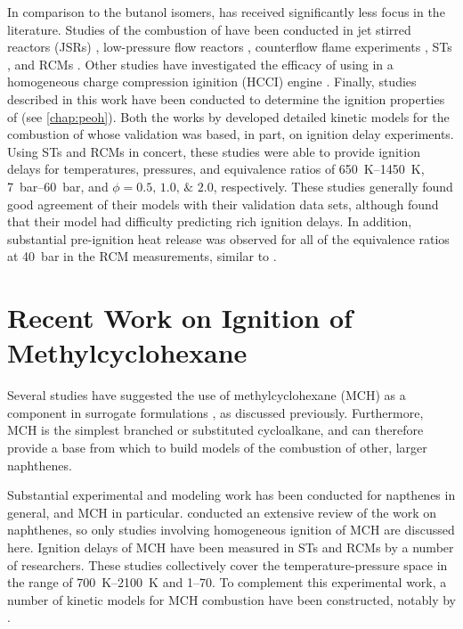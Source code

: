 \documentclass[../main.tex]{subfiles}
\begin{document}
In comparison to the butanol isomers, \iPeOH{} has received significantly
less focus in the literature. Studies of the combustion of \iPeOH{}
have been conducted in jet stirred reactors (JSRs) \cite{Dayma2011,Togbe2011,Sarathy2013}, low-pressure flow
reactors \cite{Welz2012}, counterflow flame experiments \cite{Sarathy2013},
STs \cite{Sarathy2013, Tsujimura2012, Tang2013}, and RCMs
\cite{Sarathy2013, Tsujimura2012}. Other studies have investigated
the efficacy of using \iPeOH{} in a homogeneous charge compression iginition (HCCI) engine \cite{Tsujimura2011,
Yacoub1998, Yang2010}. Finally, studies described in this work have
been conducted to determine the ignition properties of \iPeOH{} (see \cref{chap:peoh}).
Both the works by \textcite{Tsujimura2012, Sarathy2013} developed
detailed kinetic models for the combustion of \iPeOH{} whose validation
was based, in part, on ignition delay experiments. Using STs and
RCMs in concert, these studies were able to provide ignition delays
for temperatures, pressures, and equivalence ratios of
\SIrange{650}{1450}{\kelvin}, \SIrange{7}{60}{\bar}, and $\phi =
\numlist{0.5;1.0;2.0}$, respectively. These studies generally found good
agreement of their models with their validation data sets, although
\textcite{Sarathy2013} found that their model had difficulty predicting
rich ignition delays. In addition, substantial pre-ignition heat release
was observed for all of the equivalence ratios at \SI{40}{\bar} in the
RCM measurements, similar to \tBuOH{}.

\section{Recent Work on Ignition of Methylcyclohexane}

Several studies have suggested the use of methylcyclohexane (MCH) as a
component in surrogate formulations \cite{Bieleveld2009,Naik2005}, as
discussed previously. Furthermore, MCH is the simplest branched or
substituted cycloalkane, and can therefore provide a base from which
to build models of the combustion of other, larger naphthenes.

Substantial experimental and modeling work has been conducted for
napthenes in general, and MCH in particular. \textcite{Pitz2011}
conducted an extensive review of the work on naphthenes, so only studies
involving homogeneous ignition of MCH are discussed here. Ignition delays of MCH
have been measured in STs \cite{Rotavera2013, Vasu2009,
Vanderover2009, Hawthorn1966, Orme2006, Hong2011} and RCMs \cite{Tanaka2003,
Pitz2007, Mittal2009} by a number of researchers. These studies collectively
cover the temperature-pressure space in the range of \SIrange{700}{2100}{\kelvin}
and \SIrange{1}{70}{\atmosphere}. To complement this experimental work, a number
of kinetic models for MCH combustion have been constructed, notably by
\textcite{Orme2006, Pitz2007}.
\end{document}
